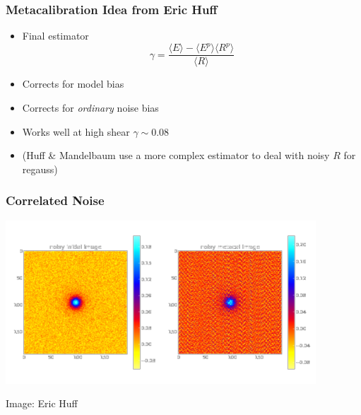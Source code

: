 \documentclass{beamer}
\begin{document}
\frame
{
    \frametitle{Metacalibration Idea from Eric Huff}

 
    \begin{itemize}
        \item Final estimator
            \begin{equation}
                \gamma = \frac{\langle E \rangle - \langle E^p \rangle \langle R^p \rangle }{ \langle R \rangle} \nonumber
            \end{equation}
       

        \item Corrects for {\color{lightskyblue} model bias}

        \item Corrects for {\em ordinary} {\color{gold} noise bias}

        \item Works well at {\color{lightsteelblue} high shear $\gamma \sim 0.08$}

        \item (Huff \& Mandelbaum use a more complex estimator to deal with noisy
            $R$ for regauss)

    \end{itemize}

}

\frame
{
    \frametitle{Correlated Noise}
 
    \begin{center}
        \includegraphics[scale=1]{metacal_noise_images_neg_crop.png}
        \newline
    \end{center}
    {\small Image: Eric Huff}

}
\end{document}
